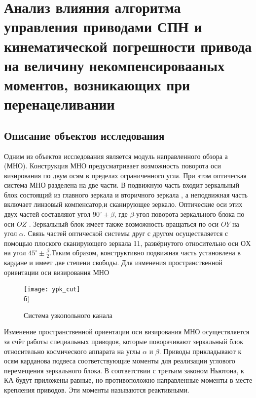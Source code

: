 \chapter{Анализ влияния алгоритма управления приводами СПН и кинематической погрешности привода на величину некомпенсировааных моментов, возникающих при перенацеливании}\label{ch:ch2}
\section{Описание объектов исследования}\label{sec:ch2/sec1}

Одним из объектов исследования является модуль направленного обзора а 
(МНО). Конструкция МНО предусматривает возможность поворота оси 
визирования по двум осям в пределах ограниченного угла. При этом оптическая 
система МНО разделена на две части. В подвижную часть входит зеркальный блок состоящий из главного зеркала  и вторичного зеркала , а неподвижная часть включает линзовый компенсатор,и сканирующее зеркало. Оптические оси этих двух частей составляют угол $90^\circ \pm \beta$, где $\beta$-угол поворота зеркального блока по оси $OZ$ . Зеркальный блок имеет также возможность вращаться по оси $OY$ на угол $\alpha$. Связь частей оптической системы друг с другом осуществляется с помощью плоского сканирующего зеркала 11, развёрнутого относительно оси $ОХ$ на угол $45^\circ \pm \frac{\beta}{2}$.Таким образом, конструктивно подвижная часть установлена в кардане и имеет две степени свободы. Для изменения пространственной ориентации оси визирования МНО


\begin{figure}[ht]
	\begin{minipage}[b][][b]{0.49\linewidth}\centering
	\end{minipage}
	\hfill
	\begin{minipage}[b][][b]{0.49\linewidth}\centering
		\texttt{[image: ypk\_cut]} \\ б)
	\end{minipage}
	\caption{Система узкопольного канала}
	\label{fig:ypk-pic}
\end{figure}
Изменение пространственной ориентации оси визирования МНО осуществляется за счёт работы специальных приводов, которые поворачивают зеркальный блок относительно космического аппарата на углы $\alpha$ и $\beta$.
Приводы прикладывают к осям карданова подвеса соответствующие моменты для реализации углового перемещения зеркального блока. В соответствии с третьим законом Ньютона, к КА будут приложены равные, но противоположно направленные моменты в месте крепления приводов. Эти моменты называются реактивными.

